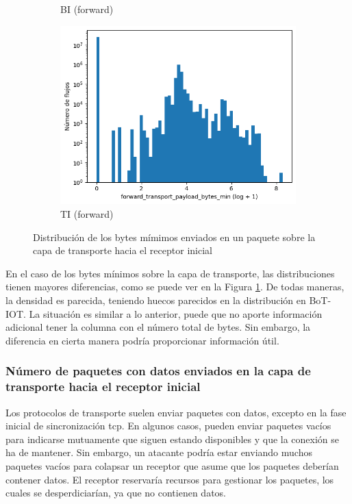\begin{figure}[H]
\begin{subfigure}[b]{0.32\textwidth}
        \caption{BI (forward)}
    \end{subfigure}
    \hfill
    \begin{subfigure}[b]{0.32\textwidth}
        \centering
        \includegraphics[width=\linewidth]{media/packet_pincer_toniot/forward_transport_payload_bytes_min_log_x_log_y.png}
        \caption{TI (forward)}
    \end{subfigure}
       \caption{Distribución de los bytes mímimos enviados en un paquete sobre la capa de transporte hacia el receptor inicial}
       \label{fig:packet_pincer_forward_transport_payload_bytes_min}
\end{figure}

En el caso de los bytes mínimos sobre la capa de transporte, las distribuciones tienen mayores diferencias, como se puede ver en la Figura \ref{fig:packet_pincer_forward_transport_payload_bytes_min}. De todas maneras, la densidad es parecida, teniendo huecos parecidos en la distribución en BoT-IOT. La situación es similar a lo anterior, puede que no aporte información adicional tener la columna con el número total de bytes. Sin embargo, la diferencia en cierta manera podría proporcionar información útil.

\subsubsection{Número de paquetes con datos enviados en la capa de transporte hacia el receptor inicial}

Los protocolos de transporte suelen enviar paquetes con datos, excepto en la fase inicial de sincronización \acrshort{tcp}. En algunos casos, pueden enviar paquetes vacíos para indicarse mutuamente que siguen estando disponibles y que la conexión se ha de mantener. Sin embargo, un atacante podría estar enviando muchos paquetes vacíos para colapsar un receptor que asume que los paquetes deberían contener datos. El receptor reservaría recursos para gestionar los paquetes, los cuales se desperdiciarían, ya que no contienen datos.

